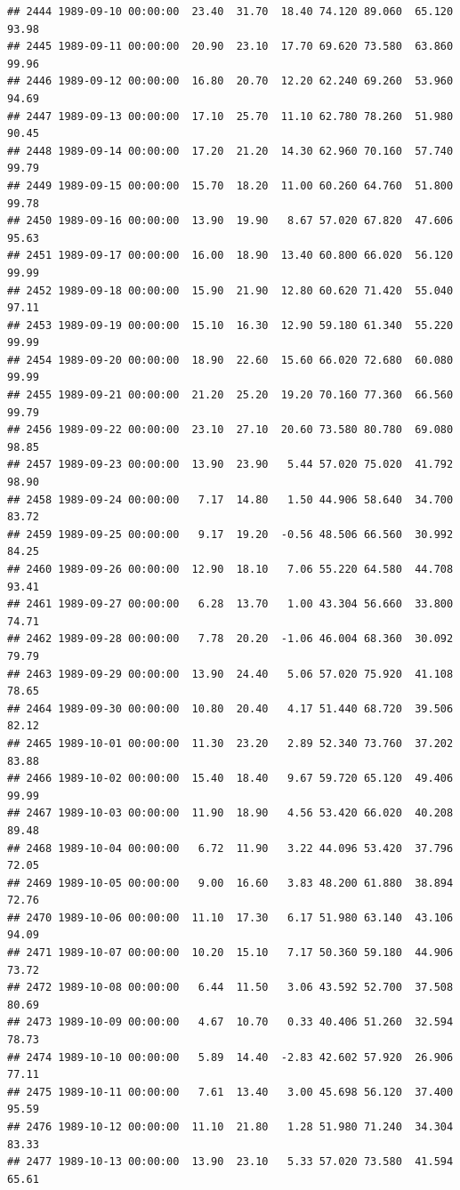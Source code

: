 \documentclass{article}\usepackage{graphicx, color}
\makeatletter
\newenvironment{kframe}{%
 \def\at@end@of@kframe{}%
 \ifinner\ifhmode%
  \def\at@end@of@kframe{\end{minipage}}%
  \begin{minipage}{\columnwidth}%
 \fi\fi%
 \def\FrameCommand##1{\hskip\@totalleftmargin \hskip-\fboxsep
 \colorbox{shadecolor}{##1}\hskip-\fboxsep
     \hskip-\linewidth \hskip-\@totalleftmargin \hskip\columnwidth}%
 \MakeFramed {\advance\hsize-\width
   \@totalleftmargin\z@ \linewidth\hsize
   \@setminipage}}%
 {\par\unskip\endMakeFramed%
 \at@end@of@kframe}
\newenvironment{knitrout}{}{} %
\makeatother
\begin{document}
\begin{knitrout}
\begin{kframe}
\begin{verbatim}
## 2444 1989-09-10 00:00:00  23.40  31.70  18.40 74.120 89.060  65.120  93.98
## 2445 1989-09-11 00:00:00  20.90  23.10  17.70 69.620 73.580  63.860  99.96
## 2446 1989-09-12 00:00:00  16.80  20.70  12.20 62.240 69.260  53.960  94.69
## 2447 1989-09-13 00:00:00  17.10  25.70  11.10 62.780 78.260  51.980  90.45
## 2448 1989-09-14 00:00:00  17.20  21.20  14.30 62.960 70.160  57.740  99.79
## 2449 1989-09-15 00:00:00  15.70  18.20  11.00 60.260 64.760  51.800  99.78
## 2450 1989-09-16 00:00:00  13.90  19.90   8.67 57.020 67.820  47.606  95.63
## 2451 1989-09-17 00:00:00  16.00  18.90  13.40 60.800 66.020  56.120  99.99
## 2452 1989-09-18 00:00:00  15.90  21.90  12.80 60.620 71.420  55.040  97.11
## 2453 1989-09-19 00:00:00  15.10  16.30  12.90 59.180 61.340  55.220  99.99
## 2454 1989-09-20 00:00:00  18.90  22.60  15.60 66.020 72.680  60.080  99.99
## 2455 1989-09-21 00:00:00  21.20  25.20  19.20 70.160 77.360  66.560  99.79
## 2456 1989-09-22 00:00:00  23.10  27.10  20.60 73.580 80.780  69.080  98.85
## 2457 1989-09-23 00:00:00  13.90  23.90   5.44 57.020 75.020  41.792  98.90
## 2458 1989-09-24 00:00:00   7.17  14.80   1.50 44.906 58.640  34.700  83.72
## 2459 1989-09-25 00:00:00   9.17  19.20  -0.56 48.506 66.560  30.992  84.25
## 2460 1989-09-26 00:00:00  12.90  18.10   7.06 55.220 64.580  44.708  93.41
## 2461 1989-09-27 00:00:00   6.28  13.70   1.00 43.304 56.660  33.800  74.71
## 2462 1989-09-28 00:00:00   7.78  20.20  -1.06 46.004 68.360  30.092  79.79
## 2463 1989-09-29 00:00:00  13.90  24.40   5.06 57.020 75.920  41.108  78.65
## 2464 1989-09-30 00:00:00  10.80  20.40   4.17 51.440 68.720  39.506  82.12
## 2465 1989-10-01 00:00:00  11.30  23.20   2.89 52.340 73.760  37.202  83.88
## 2466 1989-10-02 00:00:00  15.40  18.40   9.67 59.720 65.120  49.406  99.99
## 2467 1989-10-03 00:00:00  11.90  18.90   4.56 53.420 66.020  40.208  89.48
## 2468 1989-10-04 00:00:00   6.72  11.90   3.22 44.096 53.420  37.796  72.05
## 2469 1989-10-05 00:00:00   9.00  16.60   3.83 48.200 61.880  38.894  72.76
## 2470 1989-10-06 00:00:00  11.10  17.30   6.17 51.980 63.140  43.106  94.09
## 2471 1989-10-07 00:00:00  10.20  15.10   7.17 50.360 59.180  44.906  73.72
## 2472 1989-10-08 00:00:00   6.44  11.50   3.06 43.592 52.700  37.508  80.69
## 2473 1989-10-09 00:00:00   4.67  10.70   0.33 40.406 51.260  32.594  78.73
## 2474 1989-10-10 00:00:00   5.89  14.40  -2.83 42.602 57.920  26.906  77.11
## 2475 1989-10-11 00:00:00   7.61  13.40   3.00 45.698 56.120  37.400  95.59
## 2476 1989-10-12 00:00:00  11.10  21.80   1.28 51.980 71.240  34.304  83.33
## 2477 1989-10-13 00:00:00  13.90  23.10   5.33 57.020 73.580  41.594  65.61

\end{verbatim}
\end{kframe}
\end{knitrout}
\end{document}
